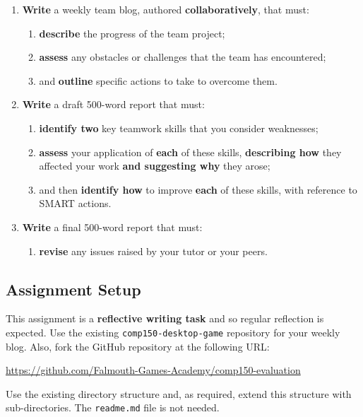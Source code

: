 \documentclass{../fal_assignment}
\begin{document}
\begin{enumerate}[label=(\alph*)]
    \item \textbf{Write} a weekly team blog, authored \textbf{collaboratively}, that must:
    	\begin{enumerate}[label=\roman*.]
    		\item \textbf{describe} the progress of the team project;
    		\item \textbf{assess} any obstacles or challenges that the team has encountered;
    		\item and \textbf{outline} specific actions to take to overcome them.
	\end{enumerate}
    \item \textbf{Write} a draft 500-word report that must:
    	\begin{enumerate}[label=\roman*.]
    		\item \textbf{identify two} key teamwork skills that you consider weaknesses;
    		\item \textbf{assess} your application of \textbf{each} of these skills, \textbf{describing how} they affected your work \textbf{and suggesting why} they arose;
    		\item and then \textbf{identify how} to improve \textbf{each} of these skills, with reference to SMART actions.
	\end{enumerate}
    \item \textbf{Write} a final 500-word report that must:
    	\begin{enumerate}[label=\roman*.]
    		\item \textbf{revise} any issues raised by your tutor or your peers.
	\end{enumerate}
\end{enumerate}

\subsection*{Assignment Setup}

This assignment is a \textbf{reflective writing task} and so regular reflection is expected. Use the existing \texttt{comp150-desktop-game} repository for your weekly blog. Also, fork the GitHub repository at the following URL:

\indent \url{https://github.com/Falmouth-Games-Academy/comp150-evaluation}

Use the existing directory structure and, as required, extend this structure with sub-directories. The \texttt{readme.md} file is not needed. 
\end{document}
